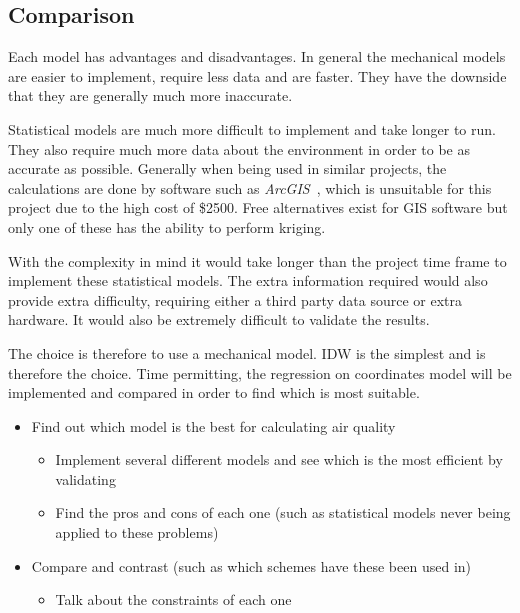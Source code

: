 \subsection{Comparison}\label{interpolationcomparison}

Each model has advantages and disadvantages. In general the mechanical models are easier to implement, require less data and are faster. They have the downside that they are generally much more inaccurate. 

Statistical models are much more difficult to implement and take longer to run. They also require much more data about the environment in order to be as accurate as possible. Generally when being used in similar projects, the calculations are done by software such as \emph{ArcGIS}~\cite{arcgis}, which is unsuitable for this project due to the high cost of \$2500. Free alternatives exist for GIS software but only one of these has the ability to perform kriging. 

With the complexity in mind it would take longer than the project time frame to implement these statistical models. The extra information required would also provide extra difficulty, requiring either a third party data source or extra hardware. It would also be extremely difficult to validate the results. 

The choice is therefore to use a mechanical model. IDW is the simplest and is therefore the choice. Time permitting, the regression on coordinates model will be implemented and compared in order to find which is most suitable. 



	\begin{itemize}
	    \item Find out which model is the best for calculating air quality
	    \begin{itemize}
	        \item Implement several different models and see which is the most efficient by validating
	        \item Find the pros and cons of each one (such as statistical models never being applied to these problems)
	    \end{itemize}
	    \item Compare and contrast (such as which schemes have these been used in)
	    \begin{itemize}
	        \item Talk about the constraints of each one
	    \end{itemize}
	\end{itemize}



